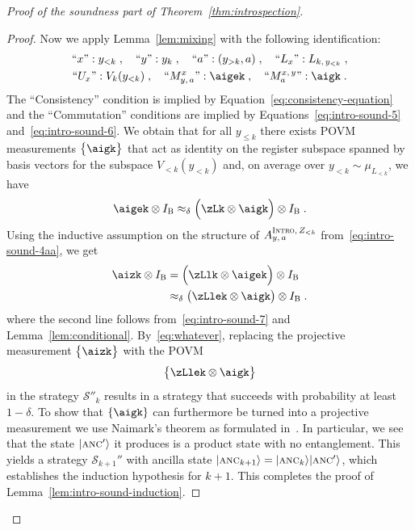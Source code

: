\documentclass[11pt]{article}
\theoremstyle{definition}
\newcommand{\ket}[1]{|#1\rangle}
\newcommand{\Id}{\ensuremath{I}}
\newcommand{\ib}{\Id_\bob}
\newcommand{\strategy}{\mathscr{S}}
\newcommand{\gamestyle}[1]{\ensuremath{\textsc{#1}}\xspace}
\newcommand{\intro}{\gamestyle{Intro}}
\newcommand{\labelstyle}[1]{\ensuremath{\textsc{#1}}\xspace}
\newcommand{\ancilla}{\labelstyle{anc}}
\newcommand{\bob}{\labelstyle{B}}
\begin{document}
\begin{proof}[Proof of the soundness part of Theorem~\ref{thm:introspection}]
\begin{proof}
    Now we apply Lemma~\ref{lem:mixing} with the following identification:
    \begin{gather*}
      \text{``$x$''}: y_{< k} \;, \quad
      \text{``$y$''}: y_{k} \;, \quad
      \text{``$a$''}: (y_{> k}, a) \;, \quad
      \text{``$L_x$''}: L_{k,\, y_{<k}} \;,\\
      \text{``$U_x$''}: V_k(y_{< k}) \;, \quad
      \text{``$M^{x}_{y,\, a}$''}: \aigek \;, \quad
      \text{``$M^{x,\, y}_a$''}: \aigk \;.
    \end{gather*}
    The ``Consistency'' condition is implied by
    Equation~\eqref{eq:consistency-equation} and the ``Commutation'' conditions
    are implied by Equations~\eqref{eq:intro-sound-5}
    and~\eqref{eq:intro-sound-6}.
    We obtain that for all $y_{\leq k}$ there exists POVM measurements $\bigl\{
    \aigk \bigr\}$ that act as identity on the register subspace spanned by
    basis vectors for the subspace $V_{< k}(y_{<k})$ and, on average over
    $y_{<k} \sim \mu_{L_{<k}}$, we have
    \begin{equation}\label{eq:intro-sound-7}
      \aigek \otimes \ib
      \approx_\delta \Bigl( \zLk \otimes \aigk  \Bigr)
      \otimes \ib\;.
    \end{equation}
    Using the inductive assumption on the structure of $A^{\intro,\,
      Z_{<k}}_{y,\, a} $ from~\eqref{eq:intro-sound-4aa}, we get
    \begin{align}
      \aizk \otimes \ib
      & = \Bigl( \zLlk \otimes \aigek \Bigr) \otimes \ib \\
      & \approx_\delta \bigl( \zLlek \otimes \aigk \bigr) \otimes \ib\;.
        \label{eq:whatever}
    \end{align}
    where the second line follows from~\eqref{eq:intro-sound-7} and
    Lemma~\ref{lem:conditional}.
    By~\eqref{eq:whatever}, replacing the projective measurement $\bigl\{\aizk
    \bigr\}$ with the POVM
    \begin{equation*}
      \bigl\{\zLlek \otimes \aigk \bigr\}
    \end{equation*}
    in the strategy $\strategy''_k$ results in a strategy that succeeds with
    probability at least $1 - \delta$.
    To show that $\{\aigk\}$ can furthermore be turned into a projective
    measurement we use Naimark's theorem as formulated in~\cite[Theorem
    5.1]{ML20}. In particular, we see that the state
    $\ket{\ancilla'}$ it produces is a product state with no entanglement.
    This yields a strategy $\strategy_{k+1}''$ with ancilla state
    $\ket{\ancilla_{k+1}} = \ket{\ancilla_k}\ket{\ancilla'}$, which establishes
    the induction hypothesis for $k+1$.
    This completes the proof of Lemma~\ref{lem:intro-sound-induction}.
  \end{proof}


\end{proof}
\end{document}

